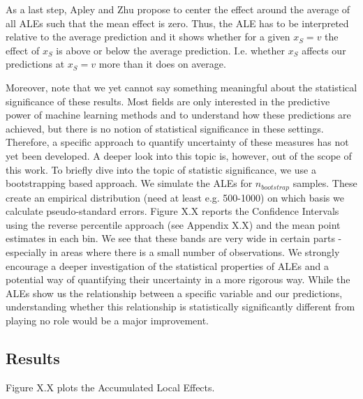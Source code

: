 As a last step, Apley and Zhu propose to center the effect around the average of all ALEs such that the mean effect is zero. Thus, the ALE has to be interpreted relative to the average prediction and it shows whether for a given $x_S=v$ the effect of $x_S$ is above or below the average prediction. I.e. whether $x_S$ affects our predictions at $x_S=v$ more than it does on average. 

Moreover, note that we yet cannot say something meaningful about the statistical significance of these results. Most fields are only interested in the predictive power of machine learning methods and to understand how these predictions are achieved, but there is no notion of statistical significance in these settings. Therefore, a specific approach to quantify uncertainty of these measures has not yet been developed. A deeper look into this topic is, however, out of the scope of this work. To briefly dive into the topic of statistic significance, we use a bootstrapping based approach. We simulate the ALEs for $n_{bootstrap}$ samples. These create an empirical distribution (need at least e.g. 500-1000) on which basis we calculate pseudo-standard errors. Figure X.X reports the Confidence Intervals using the reverse percentile approach (see Appendix X.X) and the mean point estimates in each bin. We see that these bands are very wide in certain parts - especially in areas where there is a small number of observations. We strongly encourage a deeper investigation of the statistical properties of ALEs and a potential way of quantifying their uncertainty in a more rigorous way. While the ALEs show us the relationship between a specific variable and our predictions, understanding whether this relationship is statistically significantly different from playing no role would be a major improvement.

\subsection{Results}
Figure X.X plots the Accumulated Local Effects.